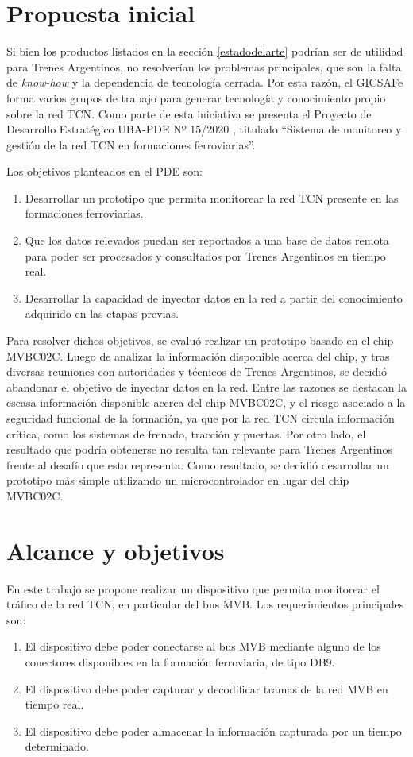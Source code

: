 \section{Propuesta inicial}

Si bien los productos listados en la sección \ref{estadodelarte} podrían ser de utilidad para Trenes Argentinos, no resolverían los problemas principales, que son la falta de \emph{know-how} y la dependencia de tecnología cerrada. Por esta razón, el GICSAFe forma varios grupos de trabajo para generar tecnología y conocimiento propio sobre la red TCN. Como parte de esta iniciativa se presenta el Proyecto de Desarrollo Estratégico UBA-PDE Nº 15/2020 \cite{pde2020}, titulado ``Sistema de monitoreo y gestión de la red TCN en formaciones ferroviarias''.

Los objetivos planteados en el PDE son:

\begin{enumerate}
\item Desarrollar un prototipo que permita monitorear la red TCN presente en las formaciones ferroviarias.
\item Que los datos relevados puedan ser reportados a una base de datos remota para poder ser procesados y consultados por Trenes Argentinos en tiempo real.
\item Desarrollar la capacidad de inyectar datos en la red a partir del conocimiento adquirido en las etapas previas.
\end{enumerate}

Para resolver dichos objetivos, se evaluó realizar un prototipo basado en el chip MVBC02C.
Luego de analizar la información disponible acerca del chip, y tras diversas reuniones con autoridades y técnicos de Trenes Argentinos, se decidió abandonar el objetivo de inyectar datos en la red.
Entre las razones se destacan la escasa información disponible acerca del chip MVBC02C, y el riesgo asociado a la seguridad funcional de la formación, ya que por la red TCN circula información crítica, como los sistemas de frenado, tracción y puertas.
Por otro lado, el resultado que podría obtenerse no resulta tan relevante para Trenes Argentinos frente al desafío que esto representa.
Como resultado, se decidió desarrollar un prototipo más simple utilizando un microcontrolador en lugar del chip MVBC02C.

\section{Alcance y objetivos}

En este trabajo se propone realizar un dispositivo que permita monitorear el tráfico de la red TCN, en particular del bus MVB. Los requerimientos principales son:

\begin{enumerate}
\item El dispositivo debe poder conectarse al bus MVB mediante alguno de los conectores disponibles en la formación ferroviaria, de tipo DB9.
\item El dispositivo debe poder capturar y decodificar tramas de la red MVB en tiempo real.
\item El dispositivo debe poder almacenar la información capturada por un tiempo determinado.
\end{enumerate}
